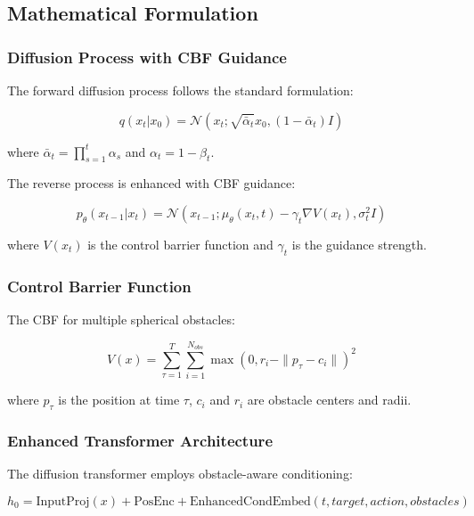 \documentclass[12pt]{article}
\begin{document}
\subsection{Mathematical Formulation}

\subsubsection{Diffusion Process with CBF Guidance}

The forward diffusion process follows the standard formulation:

\begin{equation}
q(x_t|x_0) = \mathcal{N}(x_t; \sqrt{\bar{\alpha}_t}x_0, (1-\bar{\alpha}_t)I)
\end{equation}

where $\bar{\alpha}_t = \prod_{s=1}^{t}\alpha_s$ and $\alpha_t = 1 - \beta_t$.

The reverse process is enhanced with CBF guidance:

\begin{equation}
p_\theta(x_{t-1}|x_t) = \mathcal{N}(x_{t-1}; \mu_\theta(x_t, t) - \gamma_t \nabla V(x_t), \sigma_t^2 I)
\end{equation}

where $V(x_t)$ is the control barrier function and $\gamma_t$ is the guidance strength.

\subsubsection{Control Barrier Function}

The CBF for multiple spherical obstacles:

\begin{equation}
V(x) = \sum_{\tau=1}^{T} \sum_{i=1}^{N_{obs}} \max(0, r_i - \|p_\tau - c_i\|)^2
\end{equation}

where $p_\tau$ is the position at time $\tau$, $c_i$ and $r_i$ are obstacle centers and radii.

\subsubsection{Enhanced Transformer Architecture}

The diffusion transformer employs obstacle-aware conditioning:

\begin{equation}
h_0 = \text{InputProj}(x) + \text{PosEnc} + \text{EnhancedCondEmbed}(t, target, action, obstacles)
\end{equation}
\end{document}
